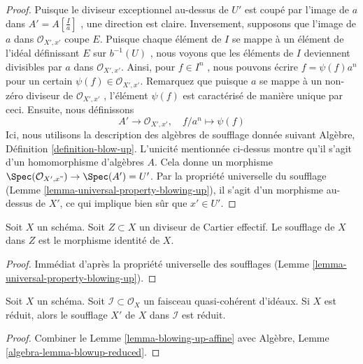\begin{proof}
Puisque le diviseur exceptionnel au-dessus de  $U'$  est coupé par l'image
de  $a$  dans  $A' = A[\frac{I}{a}]$ , une direction est claire. Inversement,
supposons que l'image de  $a$  dans  $\mathcal{O}_{X', x'}$  coupe  $E$.
Puisque chaque élément de  $I$  se mappe à un élément de l'idéal
définissant  $E$  sur  $b^{-1}(U)$ , nous voyons que les éléments de
 $I$  deviennent divisibles par  $a$  dans  $\mathcal{O}_{X', x'}$. Ainsi, pour
 $f \in I^n$ , nous pouvons écrire  $f = \psi(f) a^n$  pour un certain  $\psi(f) \in \mathcal{O}_{X', x'}$.
Remarquez que puisque  $a$  se mappe à un non-zéro diviseur de
 $\mathcal{O}_{X', x'}$ , l'élément  $\psi(f)$  est caractérisé de manière unique par ceci.
Ensuite, nous définissons
$$
A' \longrightarrow \mathcal{O}_{X', x'},\quad
f/a^n \longmapsto \psi(f)
$$
Ici, nous utilisons la description des algèbres de soufflage donnée suivant
Algèbre, Définition  \ref{definition-blow-up}. L'unicité mentionnée ci-dessus montre qu'il
s'agit d'un homomorphisme d'algèbres  $A$. Cela donne un morphisme
 $\Spec(\mathcal{O}_{X', x"}) \to \Spec(A') = U'$. Par la propriété universelle du soufflage (Lemme  \ref{lemma-universal-property-blowing-up}), il
s'agit d'un morphisme au-dessus de  $X'$, ce qui implique bien sûr que
 $x' \in U'$.
\end{proof}

\begin{lemma}
\label{lemma-blow-up-effective-Cartier-divisor}
Soit  $X$  un schéma. Soit  $Z \subset X$  un diviseur de Cartier effectif. Le
soufflage de  $X$  dans  $Z$  est le morphisme identité de
 $X$.
\end{lemma}

\begin{proof}
Immédiat d'après la propriété universelle des soufflages (Lemme  \ref{lemma-universal-property-blowing-up}).
\end{proof}

\begin{lemma}
\label{lemma-blow-up-reduced-scheme}
Soit  $X$  un schéma. Soit  $\mathcal{I} \subset \mathcal{O}_X$  un faisceau quasi-cohérent
d'idéaux. Si  $X$  est réduit, alors le soufflage  $X'$  de
 $X$  dans  $\mathcal{I}$  est réduit.
\end{lemma}

\begin{proof}
Combiner le Lemme  \ref{lemma-blowing-up-affine}  avec Algèbre, Lemme  \ref{algebra-lemma-blowup-reduced}.
\end{proof}

